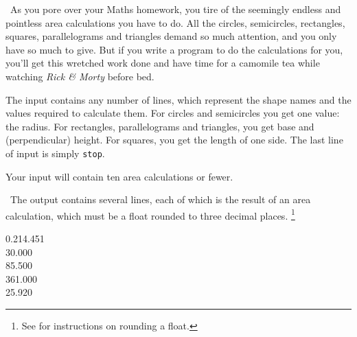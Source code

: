 
\Question\ As you pore over your Maths homework, you tire of the seemingly endless and
pointless area calculations you have to do. All the circles, semicircles, rectangles,
squares, parallelograms and triangles demand so much attention, and you only have so much
to give. But if you write a program to do the calculations for you, you'll get this
wretched work done and have time for a camomile tea while watching \emph{Rick \& Morty}
before bed.

\Input

The input contains any number of lines, which represent the shape names and the values
required to calculate them. For circles and semicircles you get one value: the radius. For
rectangles, parallelograms and triangles, you get base and (perpendicular) height. For
squares, you get the length of one side. The last line of input is simply \texttt{stop}.

Your input will contain ten area calculations or fewer.

\Output\ The output contains several lines, each of which is the result of an area
calculation, which must be a float rounded to three decimal places.%
\footnote{See  for instructions on rounding a float.}

\Sample

       {0.2}{14.451\\30.000\\85.500\\361.000\\25.920}

